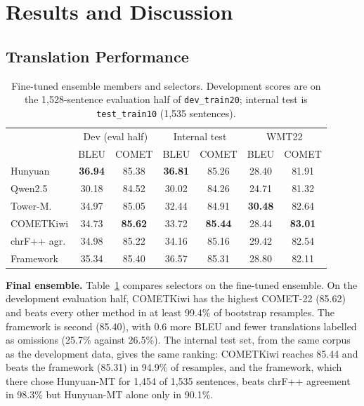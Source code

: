 \documentclass[11pt]{article}
\begin{document}
\section{Results and Discussion}
\label{sec:results}

\subsection{Translation Performance}
\label{subsec:translation_performance}

\begin{table}[t]
\centering
\small
\setlength{\tabcolsep}{3pt}
\begin{tabular}{lcccccc}
\toprule
 & \multicolumn{2}{c}{Dev (eval half)} & \multicolumn{2}{c}{Internal test} & \multicolumn{2}{c}{WMT22} \\
 & BLEU & COMET & BLEU & COMET & BLEU & COMET \\
\midrule
Hunyuan       & \textbf{36.94} & 85.38 & \textbf{36.81} & 85.26 & 28.40 & 81.91 \\
Qwen2.5       & 30.18 & 84.52 & 30.02 & 84.26 & 24.71 & 81.32 \\
Tower-M.      & 34.97 & 85.05 & 32.44 & 84.91 & \textbf{30.48} & 82.64 \\
\midrule
COMETKiwi     & 34.73 & \textbf{85.62} & 33.72 & \textbf{85.44} & 28.44 & \textbf{83.01} \\
chrF++ agr.   & 34.98 & 85.22 & 34.16 & 85.16 & 29.42 & 82.54 \\
Framework     & 35.34 & 85.40 & 36.57 & 85.31 & 28.80 & 82.11 \\
\bottomrule
\end{tabular}
\caption{Fine-tuned ensemble members and selectors. Development scores are on the 1,528-sentence evaluation half of \texttt{dev\_train20}; internal test is \texttt{test\_train10} (1,535 sentences).}
\label{tab:final_pool}
\end{table}

\textbf{Final ensemble.} Table~\ref{tab:final_pool} compares selectors on the fine-tuned ensemble. On the development evaluation half, COMETKiwi has the highest COMET-22 (85.62) and beats every other method in at least 99.4\% of bootstrap resamples. The framework is second (85.40), with 0.6 more BLEU and fewer translations labelled as omissions (25.7\% against 26.5\%). The internal test set, from the same corpus as the development data, gives the same ranking: COMETKiwi reaches 85.44 and beats the framework (85.31) in 94.9\% of resamples, and the framework, which there chose Hunyuan-MT for 1,454 of 1,535 sentences, beats chrF++ agreement in 98.3\% but Hunyuan-MT alone only in 90.1\%.
\end{document}
